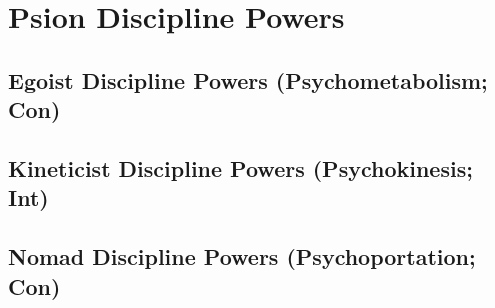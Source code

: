 \section{Psion Discipline Powers}



\subsection{Egoist Discipline Powers {\normalsize(Psychometabolism; Con)}}
\begin{enumerate*}
\item
\item
\item
\item
\item
\item
\item
\item
\item
\end{enumerate*}



\subsection{Kineticist Discipline Powers {\normalsize(Psychokinesis; Int)}}
\begin{enumerate*}
\item
\item
\item
\item
\item
\item
\item
\item
\item
\end{enumerate*}



\subsection{Nomad Discipline Powers {\normalsize(Psychoportation; Con)}}
\begin{enumerate*}
\item
\item
\item
\item
\item
\item
\item
\item
\item
\end{enumerate*}



